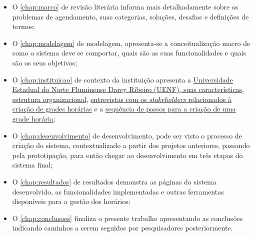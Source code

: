 \begin{itemize}
      \item O \autoref{chap:marco} de revisão literária informa mais detalhadamente sobre os problemas de agendamento, suas categorias, soluções, desafios e definições de termos;
      \item O \autoref{chap:modelagem} de modelagem, apresenta-se a conceitualização macro de como o sistema deve se comportar, quais são as suas funcionalidades e quais são os seus objetivos;
      \item O \autoref{chap:instituicao} de contexto da instituição apresenta a \hyperref[sec:estatuto]{Universidade Estadual do Norte Fluminense Darcy Ribeiro (UENF), suas características, estrutura organizacional}, \hyperref[sec:entrevistas]{entrevistas com os \textit{stakeholders} relacionados à criação de grades horárias} e a \hyperref[sec:sequencia]{sequência de passos para a criação de uma grade horária};
      \item O \autoref{chap:desenvolvimento} de desenvolvimento, pode ser visto o processo de criação do sistema, contextualizado a partir dos projetos anteriores, passando pela prototipação, para então chegar ao desenvolvimento em três etapas do sistema final;
      \item O \autoref{chap:resultados} de resultados demonstra as páginas do sistema desenvolvido, as funcionalidades implementadas e outras ferramentas disponíveis para a gestão dos horários;
      \item O \autoref{chap:conclusoes} finaliza o presente trabalho apresentando as conclusões indicando caminhos a serem seguidos por pesquisadores posteriormente.
\end{itemize}
